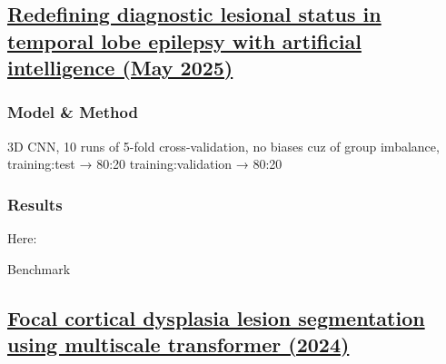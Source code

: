 \subsection{\href{https://academic.oup.com/brain/advance-article/doi/10.1093/brain/awaf020/7972755\#510821169}{Redefining diagnostic lesional status in temporal lobe epilepsy with artificial intelligence (May 2025)}}
\label{sub:sec:res7}

\subsubsection{Model \& Method}

3D CNN,
10 runs of 5-fold cross-validation,
no biases cuz of group imbalance,
training:test → 80:20
training:validation → 80:20

\subsubsection{Results}

Here: 

\begin{table}[htbp]
	\centering
	\caption{Benchmark}

	\caption{Results from }
	\label{tab:res7}
\end{table}

\subsection{\href{https://insightsimaging.springeropen.com/articles/10.1186/s13244-024-01803-8}{Focal cortical dysplasia lesion segmentation using multiscale transformer (2024)}}
\label{sub:sec:res8}

